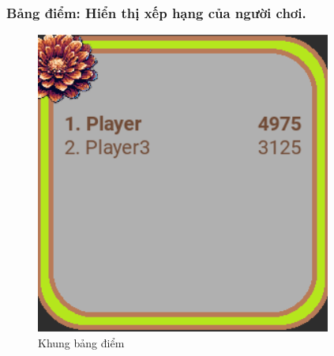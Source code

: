 \documentclass[a4paper]{article}
\begin{document}
\newpage
\subsubsection{Bảng điểm: Hiển thị xếp hạng của người chơi.}
\begin{figure}[h!]
    \centering
    \includegraphics[width=1\linewidth]{score.png}
    \caption{Khung bảng điểm}
\end{figure}

\newpage
\end{document}
